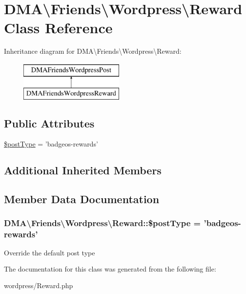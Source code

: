 \hypertarget{classDMA_1_1Friends_1_1Wordpress_1_1Reward}{\section{D\-M\-A\textbackslash{}Friends\textbackslash{}Wordpress\textbackslash{}Reward Class Reference}
\label{classDMA_1_1Friends_1_1Wordpress_1_1Reward}
}
Inheritance diagram for D\-M\-A\textbackslash{}Friends\textbackslash{}Wordpress\textbackslash{}Reward\-:\begin{figure}[H]
\begin{center}
\leavevmode
\includegraphics[height=2.000000cm]{d6/d94/classDMA_1_1Friends_1_1Wordpress_1_1Reward}
\end{center}
\end{figure}
\subsection*{Public Attributes}
\begin{DoxyCompactItemize}
\item 
\hyperlink{classDMA_1_1Friends_1_1Wordpress_1_1Reward_a653920c3f524beabf1ab4350ae09df69}{\$post\-Type} = 'badgeos-\/rewards'
\end{DoxyCompactItemize}
\subsection*{Additional Inherited Members}


\subsection{Member Data Documentation}
\hypertarget{classDMA_1_1Friends_1_1Wordpress_1_1Reward_a653920c3f524beabf1ab4350ae09df69}{
\subsubsection[{\$post\-Type}]{\setlength{\rightskip}{0pt plus 5cm}D\-M\-A\textbackslash{}\-Friends\textbackslash{}\-Wordpress\textbackslash{}\-Reward\-::\$post\-Type = 'badgeos-\/rewards'}}\label{classDMA_1_1Friends_1_1Wordpress_1_1Reward_a653920c3f524beabf1ab4350ae09df69}
Override the default post type 

The documentation for this class was generated from the following file\-:\begin{DoxyCompactItemize}
\item 
wordpress/Reward.\-php\end{DoxyCompactItemize}
